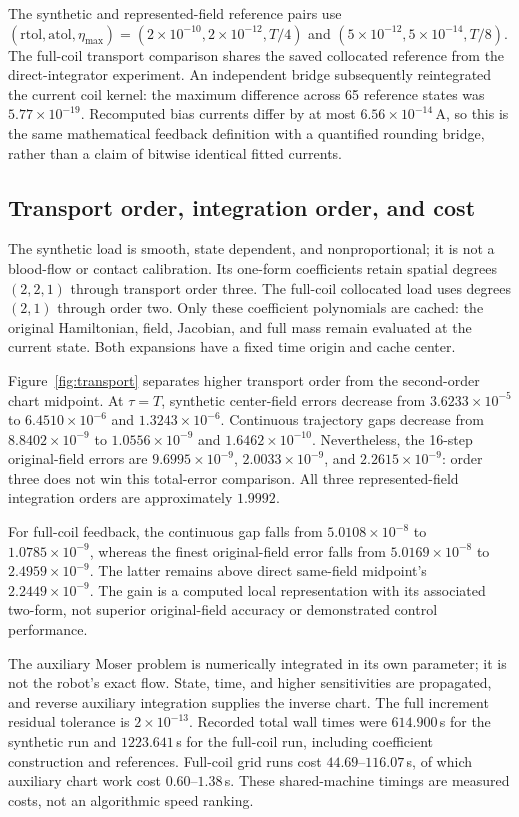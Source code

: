 The synthetic and represented-field reference pairs use
$(\mathrm{rtol},\mathrm{atol},\eta_{\max})=(2\times10^{-10},2\times10^{-12},T/4)$
and $(5\times10^{-12},5\times10^{-14},T/8)$. The full-coil transport comparison
shares the saved collocated reference from the direct-integrator experiment.
An independent bridge subsequently reintegrated the current coil kernel: the
maximum difference across 65 reference states was $5.77\times10^{-19}$.
Recomputed bias currents differ by at most $6.56\times10^{-14}$\,A, so this is
the same mathematical feedback definition with a quantified rounding bridge,
rather than a claim of bitwise identical fitted currents.

\subsection{Transport order, integration order, and cost}

The synthetic load is smooth, state dependent, and nonproportional; it is not a
blood-flow or contact calibration. Its one-form coefficients retain spatial
degrees $(2,2,1)$ through transport order three. The full-coil collocated load
uses degrees $(2,1)$ through order two. Only these coefficient polynomials are
cached: the original Hamiltonian, field, Jacobian, and full mass remain evaluated
at the current state. Both expansions have a fixed time origin and cache center.

Figure~\ref{fig:transport} separates higher transport order from the second-order
chart midpoint. At $\tau=T$, synthetic center-field errors decrease from
$3.6233\times10^{-5}$ to $6.4510\times10^{-6}$ and
$1.3243\times10^{-6}$. Continuous trajectory gaps decrease from
$8.8402\times10^{-9}$ to $1.0556\times10^{-9}$ and
$1.6462\times10^{-10}$. Nevertheless, the 16-step original-field errors are
$9.6995\times10^{-9}$, $2.0033\times10^{-9}$, and
$2.2615\times10^{-9}$: order three does not win this total-error comparison.
All three represented-field integration orders are approximately $1.9992$.

For full-coil feedback, the continuous gap falls from $5.0108\times10^{-8}$ to
$1.0785\times10^{-9}$, whereas the finest original-field error falls from
$5.0169\times10^{-8}$ to $2.4959\times10^{-9}$. The latter remains above direct
same-field midpoint's $2.2449\times10^{-9}$. The gain is a computed local
representation with its associated two-form, not superior original-field
accuracy or demonstrated control performance.

The auxiliary Moser problem is numerically integrated in its own parameter;
it is not the robot's exact flow. State, time, and higher sensitivities are
propagated, and reverse auxiliary integration supplies the inverse chart.
The full increment residual tolerance is $2\times10^{-13}$. Recorded total
wall times were $614.900$\,s for the synthetic run and $1223.641$\,s for the
full-coil run, including coefficient construction and references. Full-coil
grid runs cost $44.69$--$116.07$\,s, of which auxiliary chart work cost
$0.60$--$1.38$\,s. These shared-machine timings are measured costs, not an
algorithmic speed ranking.

